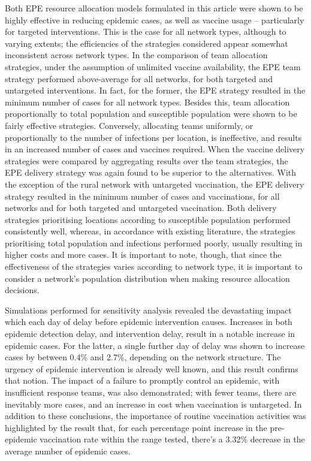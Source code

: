 \documentclass[10pt,letterpaper]{article}
\begin{document}
Both EPE resource allocation models formulated in this article were shown to be highly effective in reducing epidemic cases, as well as vaccine usage -- particularly for targeted interventions. This is the case for all network types, although to varying extents; the efficiencies of the strategies considered appear somewhat inconsistent across network types.
In the comparison of team allocation strategies, under the assumption of unlimited vaccine availability, the EPE team strategy performed above-average for all networks, for both targeted and untargeted interventions. In fact, for the former, the EPE strategy resulted in the minimum number of cases for all network types. Besides this, team allocation proportionally to total population and susceptible population were shown to be fairly effective strategies. Conversely, allocating teams uniformly, or proportionally to the number of infections per location, is ineffective, and results in an increased number of cases and vaccines required.
When the vaccine delivery strategies were compared by aggregating results over the team strategies, the EPE delivery strategy was again found to be superior to the alternatives. With the exception of the rural network with untargeted vaccination, the EPE delivery strategy resulted in the minimum number of cases and vaccinations, for all networks and for both targeted and untargeted vaccination. Both delivery strategies prioritising locations according to susceptible population performed consistently well, whereas, in accordance with existing literature, the strategies prioritising total population and infections performed poorly, usually resulting in higher costs and more cases. 
It is important to note, though, that since the effectiveness of the strategies varies according to network type, it is important to consider a network's population distribution when making resource allocation decisions.

Simulations performed for sensitivity analysis revealed the devastating impact which each day of delay before epidemic intervention causes. Increases in both epidemic detection delay, and intervention delay, result in a notable increase in epidemic cases. For the latter, a single further day of delay was shown to increase cases by between 0.4\% and 2.7\%, depending on the network structure. The urgency of epidemic intervention is already well known, and this result confirms that notion. The impact of a failure to promptly control an epidemic, with insufficient response teams, was also demonstrated; with fewer teams, there are inevitably more cases, and an increase in cost when vaccination is untargeted. In addition to these conclusions, the importance of routine vaccination activities was highlighted by the result that, for each percentage point increase in the pre-epidemic vaccination rate within the range tested, there's a 3.32\% decrease in the average number of epidemic cases.
\end{document}
